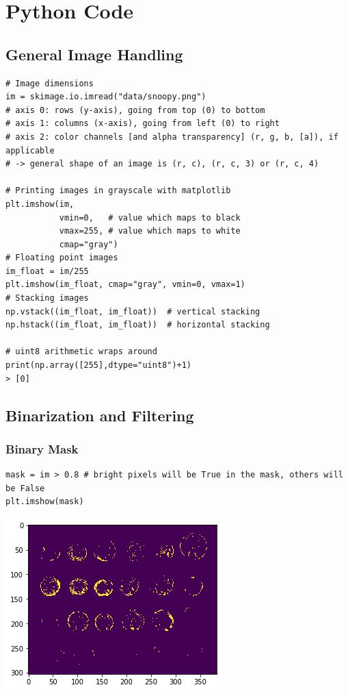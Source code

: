 
\section{Python Code}

\subsection{General Image Handling}
\begin{verbatim}
# Image dimensions
im = skimage.io.imread("data/snoopy.png")
# axis 0: rows (y-axis), going from top (0) to bottom
# axis 1: columns (x-axis), going from left (0) to right
# axis 2: color channels [and alpha transparency] (r, g, b, [a]), if applicable
# -> general shape of an image is (r, c), (r, c, 3) or (r, c, 4)

# Printing images in grayscale with matplotlib
plt.imshow(im,
           vmin=0,   # value which maps to black
           vmax=255, # value which maps to white
           cmap="gray")
# Floating point images
im_float = im/255
plt.imshow(im_float, cmap="gray", vmin=0, vmax=1)
# Stacking images
np.vstack((im_float, im_float))  # vertical stacking
np.hstack((im_float, im_float))  # horizontal stacking

# uint8 arithmetic wraps around
print(np.array([255],dtype="uint8")+1)
> [0]
\end{verbatim}


\subsection{Binarization and Filtering}

\subsubsection{Binary Mask}
\begin{verbatim}
mask = im > 0.8 # bright pixels will be True in the mask, others will be False
plt.imshow(mask)
\end{verbatim}
\begin{center}
	\includegraphics[width=0.4\linewidth]{img/BinaryMask.png}
\end{center}


